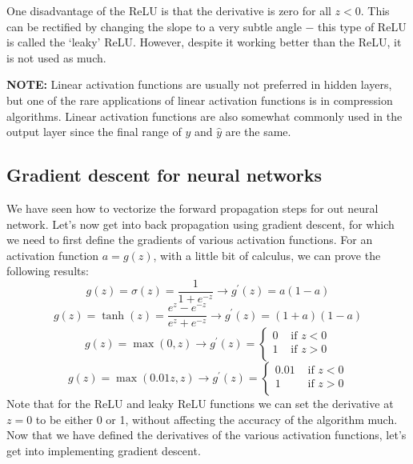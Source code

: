 \documentclass{article}[a4paper,12pt]
\theoremstyle{definition}
\begin{document}
One disadvantage of the ReLU is that the derivative is zero for all $z<0$. This can be rectified by changing the slope to a very subtle angle $-$ this type of ReLU is called the `leaky' ReLU. However, despite it working better than the ReLU, it is not used as much.
\vspace{18pt}

\textbf{NOTE:} Linear activation functions are usually not preferred in hidden layers, but one of the rare applications of linear activation functions is in compression algorithms. Linear activation functions are also somewhat commonly used in the output layer since the final range of $y$ and $\hat{y}$ are the same.
\subsection{Gradient descent for neural networks}
We have seen how to vectorize the forward propagation steps for out neural network. Let's now get into back propagation using gradient descent, for which we need to first define the gradients of various activation functions. For an activation function $a=g(z)$, with a little bit of calculus, we can prove the following results:
$$g(z)=\sigma(z)=\frac{1}{1+e^{-z}}\longrightarrow g^{\prime}(z)=a(1-a)$$
$$g(z)=\tanh(z)=\frac{e^z-e^{-z}}{e^z+e^{-z}}\longrightarrow g^{\prime}(z)=(1+a)(1-a)$$
$$g(z)=\max(0,z)\longrightarrow g^{\prime}(z)= \left\{
\begin{array}{cc}
	0 & \text{ if } z<0\\
	1 & \text{ if } z>0\\ 
\end{array} \right.$$
$$g(z)=\max(0.01z,z)\longrightarrow g^{\prime}(z)= \left\{
\begin{array}{lc}
	0.01 & \text{ if } z<0\\
	1 & \text{ if } z>0\\ 
\end{array} \right.$$
Note that for the ReLU and leaky ReLU functions we can set the derivative at $z=0$ to be either 0 or 1, without affecting the accuracy of the algorithm much. Now that we have defined the derivatives of the various activation functions, let's get into implementing gradient descent.
\vspace{6pt}
\end{document}
